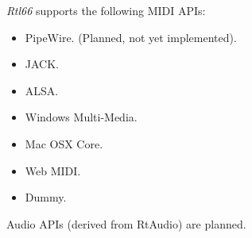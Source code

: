    \textsl{Rtl66} supports the following MIDI APIs:

   \begin{itemize}
      \item PipeWire. (Planned, not yet implemented).
      \item JACK.
      \item ALSA.
      \item Windows Multi-Media.
      \item Mac OSX Core.
      \item Web MIDI.
      \item Dummy.
   \end{itemize}

   Audio APIs (derived from RtAudio) are planned.

